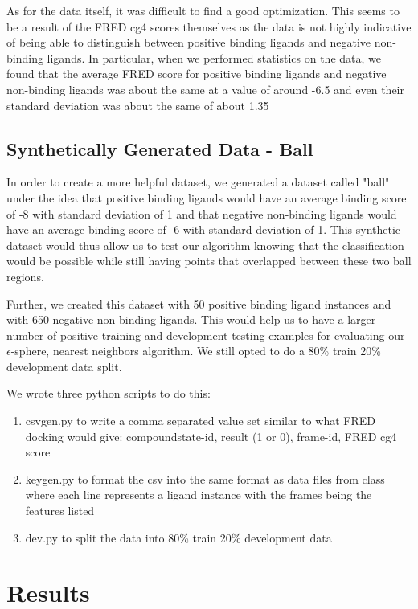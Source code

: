 \documentclass[11pt,letterpaper]{article}
\begin{document}
As for the data itself, it was difficult to find a good optimization.  This seems to be a result of the FRED cg4 scores themselves as the data is not highly indicative of being able to distinguish between positive binding ligands and negative non-binding ligands.  In particular, when we performed statistics on the data, we found that the average FRED score for positive binding ligands and negative non-binding ligands was about the same at a value of around -6.5 and even their standard deviation was about the same of about 1.35

\subsection{Synthetically Generated Data - Ball}
In order to create a more helpful dataset, we generated a dataset called "ball" under the idea that positive binding ligands would have an average binding score of -8 with standard deviation of 1 and that negative non-binding ligands would have an average binding score of -6 with standard deviation of 1.  This synthetic dataset would thus allow us to test our algorithm knowing that the classification would be possible while still having points that overlapped between these two ball regions.

Further, we created this dataset with 50 positive binding ligand instances and with 650 negative non-binding ligands.  This would help us to have a larger number of positive training and development testing examples for evaluating our $\epsilon$-sphere, nearest neighbors algorithm.  We still opted to do a 80\% train 20\% development data split.

We wrote three python scripts to do this: 

\begin{enumerate} 	
	\item csvgen.py to write a comma separated value set similar to what FRED docking would give: compoundstate-id, result (1 or 0), frame-id, FRED cg4 score
	\item keygen.py to format the csv into the same format as data files from class where each line represents a ligand instance with the frames being the features listed
	\item dev.py to split the data into 80\% train 20\% development data
\end{enumerate}

\section{Results}
\end{document}
